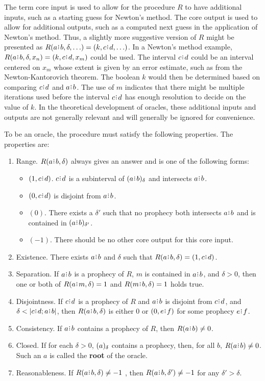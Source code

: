 \documentclass[12pt]{article}
\begin{document}
The term core input is used to allow for the procedure $R$ to have additional inputs, such as a starting guess for Newton's method. The core output is used to allow for additional outputs, such as a computed next guess in the application of Newton's method. Thus, a slightly more suggestive version of $R$ might be presented as $R(a \rint b, \delta, \ldots) = (k, c \rint d, \ldots)$. In a Newton's method example, $R(a \rint b, \delta, x_n) = (k, c \rint d, x_m)$ could be used. The interval $c \rint d$ could be an interval centered on $x_m$ whose extent is given by an error estimate, such as from the Newton-Kantorovich theorem. The boolean $k$ would then be determined based on comparing $c \rint d$ and $a \rint b$. The use of $m$ indicates that there might be multiple iterations used before the interval $c \rint d$ has enough resolution to decide on the value of $k$. In the theoretical development of oracles, these additional inputs and outputs are not generally relevant and will generally be ignored for convenience.  

To be an oracle, the procedure must satisfy the following properties.  The properties are:
\begin{enumerate}
    \item Range. $R(a\rint b, \delta)$  always gives an answer and is one of the following forms: 
    \begin{itemize}
        \item $(1, c\rint d)$. $c\rint d$ is a subinterval of $\halo{a\rint b}$ and intersects $a\rint b$. 
        \item $(0, c\rint d)$ is disjoint from $a\rint b$.
        \item $(0)$.  There exists a $\delta'$ such that no prophecy both intersects $a \rint b$ and is contained in $\halo[\delta']{a \rint b}$. 
        \item $(-1)$. There should be no other core output for this core input. 
    \end{itemize} 
    \item Existence. There exists $a \rint b$ and $\delta$ such that $R(a \rint b, \delta) = (1, c\rint d)$. 
    \item Separation. If $a\rint b$ is a prophecy of $R$, $m$ is contained in $a\rint b$, and $\delta > 0$, then one or both of $R(a \rint m, \delta) =1$  and $R(m \rint b, \delta) = 1$ holds true. 
   \item Disjointness. 
   If $c\rint d$ is a prophecy of $R$ and $a\rint b$ is disjoint from $c\rint d$, and $\delta < |c \rint d; a\rint b|$, then $R(a\rint b, \delta)$ is either $0$ or $(0, e \rint f)$ for some prophecy $e \rint f$.
    \item Consistency. If $a\rint b$ contains a prophecy of $R$, then $R(a\rint b) \neq 0$. 
    \item Closed. 
    If for each $\delta >0$, $(a)_{\delta}$ contains a prophecy, then, for all $b$, $R(a\rint b) \neq 0$. Such an $a$ is called the \textbf{root} of the oracle. 
    \item Reasonableness. If $R(a\rint b, \delta) \neq -1$ , then $R(a\rint b, \delta') \neq -1$ for any $\delta' > \delta$.
\end{enumerate}
\end{document}
